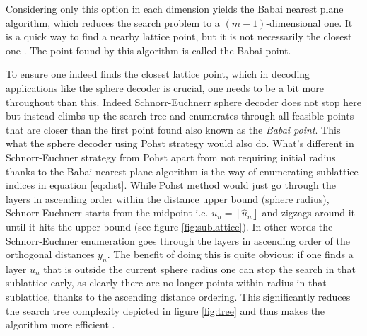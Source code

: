\documentclass[english,12pt,a4paper,pdftex,sci,utf8]{aaltothesis}
\begin{document}
Considering only this option in each dimension yields the Babai nearest plane algorithm, which reduces the search problem to a $(m-1)$-dimensional one. It is a quick way to find a nearby lattice point, but it is not necessarily the closest one \cite{agrell}. The point found by this algorithm is called the Babai point.
\par To ensure one indeed finds the closest lattice point, which in decoding applications like the sphere decoder is crucial, one needs to be a bit more throughout than this. Indeed Schnorr-Euchnerr sphere decoder does not stop here but instead climbs up the search tree and enumerates through all feasible points that are closer than the first point found also known as the \emph{Babai point}. This what the sphere decoder using Pohst strategy would also do. What's different in Schnorr-Euchner strategy from Pohst apart from not requiring initial radius thanks to the Babai nearest plane algorithm is the way of enumerating sublattice indices in equation \eqref{eq:dist}. While Pohst method would just go through the layers in ascending order within the distance upper bound (sphere radius), Schnorr-Euchnerr starts from the midpoint i.e. $u_n = \left\lceil\hat{u}_n\right\rfloor$ and zigzags around it until it hits the upper bound (see figure \ref{fig:sublattice}). In other words the Schnorr-Euchner enumeration goes through the layers in ascending order of the orthogonal distances $y_n$. The benefit of doing this is quite obvious: if one finds a layer $u_n$ that is outside the current sphere radius one can stop the search in that sublattice early, as clearly there are no longer points within radius in that sublattice, thanks to the ascending distance ordering. This significantly reduces the search tree complexity depicted in figure \ref{fig:tree} and thus makes the algorithm more efficient \cite{mia}\cite{agrell}.
\end{document}

